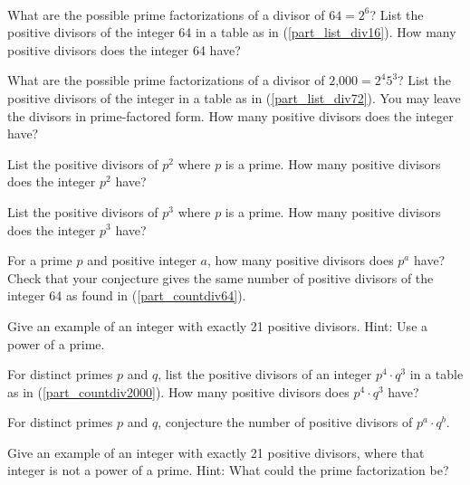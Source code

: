 \begin{act}
\label{act_list_count_divisors_using_prime_fact}
~
    \begin{actpart}
    
        \item \label{part_countdiv64}  What are the possible prime factorizations of a divisor of $64 = 2^6$?  List the positive divisors of the integer 64 in a table as in  (\ref{part_list_div16}).  How many positive divisors does the integer 64 have?
        
        \item \label{part_countdiv2000} What are the possible prime factorizations of a divisor of $\text{2,000} = 2^4 5^3$?  List the positive divisors of the integer  in a table as in  (\ref{part_list_div72}).  You may leave the divisors in prime-factored form.  How many positive divisors does the integer  have?
        
        \item \label{part_divisors_primesq} List the positive divisors of $p^2$ where $p$ is a prime. How many positive divisors does the integer $p^2$ have? 
        
        \item \label{part_divisors_primecubed} List the positive divisors of $p^3$ where $p$ is a prime. How many positive divisors does the integer $p^3$ have?

        \item For a prime $p$ and positive integer $a$, how many positive divisors does $p^a$ have? Check that your conjecture gives the same number of positive divisors of the integer 64 as found in (\ref{part_countdiv64}).

        \item Give an example of an integer with exactly 21 positive divisors.  Hint: Use a power of a prime.
        
        \item For distinct primes $p$ and $q$, list the positive divisors of an integer $p^4\cdot q^3$ in a table as in (\ref{part_countdiv2000}).   How many positive divisors does $p^4\cdot q^3$ have?

        \item For distinct primes $p$ and $q$, conjecture the number of positive divisors of $p^a\cdot q^b$. 

        \item Give an example of an integer with exactly 21 positive divisors, where that integer is not a power of a prime.  Hint: What could the prime factorization be?
    \end{actpart}
\end{act}

